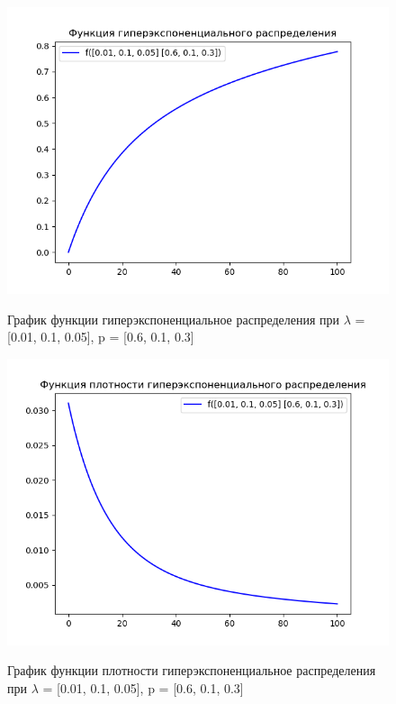 \begin{figure}[h]
	\centering
	\includegraphics[scale = 0.5]{img/3.png}
	\label{fig:screenshot003}
	\caption{График функции гиперэкспоненциальное распределения при $\lambda$ = [0.01, 0.1, 0.05], p = [0.6, 0.1, 0.3]}
\end{figure}

\begin{figure}[h]
	\centering
	\includegraphics[scale = 0.5]{img/4.png}
	\label{fig:screenshot004}
	\caption{График функции плотности гиперэкспоненциальное распределения при $\lambda$ = [0.01, 0.1, 0.05], p = [0.6, 0.1, 0.3]}
\end{figure}

